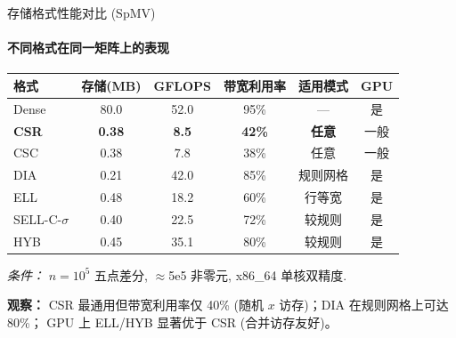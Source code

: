 \documentclass[12pt,aspectratio=169]{beamer}
\begin{document}
\begin{frame}[shrink]{存储格式性能对比 (SpMV)}
\framesubtitle{不同格式在同一矩阵上的表现}

\footnotesize
\begin{center}
\renewcommand{\arraystretch}{1.1}
\begin{tabular}{@{}l c c c c c@{}}
\toprule
\textbf{格式} & \textbf{存储(MB)} & \textbf{GFLOPS} & \textbf{带宽利用率} & \textbf{适用模式} & \textbf{GPU} \\
\midrule
Dense      & 80.0   & 52.0  & 95\%  & —        & 是 \\
\textbf{CSR} & \textbf{0.38} & \textbf{8.5} & \textbf{42\%} & \textbf{任意} & 一般 \\
CSC        & 0.38   & 7.8   & 38\%  & 任意     & 一般 \\
DIA        & 0.21   & 42.0  & 85\%  & 规则网格 & 是 \\
ELL        & 0.48   & 18.2  & 60\%  & 行等宽   & 是 \\
SELL-C-$\sigma$ & 0.40 & 22.5 & 72\%  & 较规则   & 是 \\
HYB        & 0.45   & 35.1  & 80\%  & 较规则   & 是 \\
\bottomrule
\end{tabular}
\end{center}

\vspace{2pt}
{\footnotesize \textit{条件：} $n=10^5$ 五点差分, $\approx$5e5 非零元, x86\_64 单核双精度.}

\vspace{2pt}
\small
\textbf{观察：} CSR 最通用但带宽利用率仅 40\% (随机 $x$ 访存)；DIA 在规则网格上可达 80\%；
GPU 上 ELL/HYB 显著优于 CSR (合并访存友好)。
\end{frame}
\end{document}
